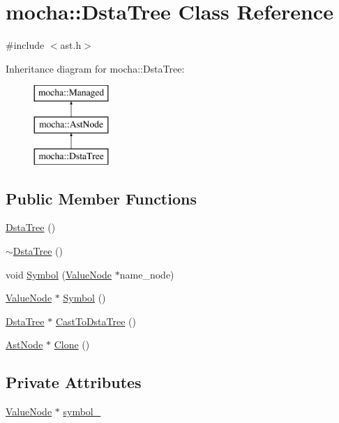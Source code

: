 \hypertarget{classmocha_1_1_dsta_tree}{
\section{mocha::DstaTree Class Reference}
\label{classmocha_1_1_dsta_tree}
}


{\ttfamily \#include $<$ast.h$>$}

Inheritance diagram for mocha::DstaTree:\begin{figure}[H]
\begin{center}
\leavevmode
\includegraphics[height=3.000000cm]{classmocha_1_1_dsta_tree}
\end{center}
\end{figure}
\subsection*{Public Member Functions}
\begin{DoxyCompactItemize}
\item 
\hyperlink{classmocha_1_1_dsta_tree_a7ab3a8c0fb0c90ac7c52983e517da946}{DstaTree} ()
\item 
\hyperlink{classmocha_1_1_dsta_tree_a3b937cde6d030946545aa56288628553}{$\sim$DstaTree} ()
\item 
void \hyperlink{classmocha_1_1_dsta_tree_a6ef49ba20cdae2f5885f859e6ea7c9c1}{Symbol} (\hyperlink{classmocha_1_1_value_node}{ValueNode} $\ast$name\_\-node)
\item 
\hyperlink{classmocha_1_1_value_node}{ValueNode} $\ast$ \hyperlink{classmocha_1_1_dsta_tree_a802c6e500924642bc6d9d3d7eb0f6dfd}{Symbol} ()
\item 
\hyperlink{classmocha_1_1_dsta_tree}{DstaTree} $\ast$ \hyperlink{classmocha_1_1_dsta_tree_ae92825dfc9d2948785372a4ee9cb84e2}{CastToDstaTree} ()
\item 
\hyperlink{classmocha_1_1_ast_node}{AstNode} $\ast$ \hyperlink{classmocha_1_1_dsta_tree_ad3734941331f65240d7759b1e71d7aa7}{Clone} ()
\end{DoxyCompactItemize}
\subsection*{Private Attributes}
\begin{DoxyCompactItemize}
\item 
\hyperlink{classmocha_1_1_value_node}{ValueNode} $\ast$ \hyperlink{classmocha_1_1_dsta_tree_a2f8ea0fffe5c79c367e20f7af8efa175}{symbol\_\-}
\end{DoxyCompactItemize}


